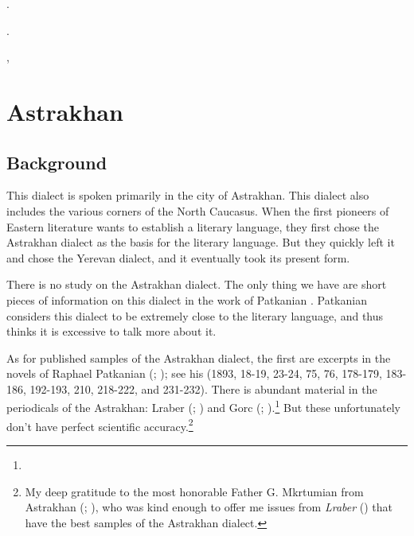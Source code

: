.

.

,







\chapter{Astrakhan}\label{chapter:Astrakhan}

\section{Background}

\begin{adjarianpage}\label{page:82}\end{adjarianpage}%

This dialect is spoken primarily in the city of Astrakhan. This dialect also includes the various corners of the North Caucasus. When the first pioneers of Eastern literature wants to establish a literary language, they first chose the Astrakhan dialect as the basis for the literary language. But they quickly left it and chose the Yerevan dialect, and it eventually took its present form. 

There is no study on the Astrakhan dialect. The only thing we have are short pieces of information on this dialect in the work of Patkanian \citep[24]{Patkanian-1869-RussianDialects}. Patkanian considers this dialect to be extremely close to the literary language, and thus thinks it is excessive to talk more about it. 

As for published samples of the Astrakhan dialect, the first are excerpts in the novels of Raphael Patkanian (; ); see his  (1893,  18-19, 23-24, 75, 76, 178-179, 183-186, 192-193, 210, 218-222, and 231-232). There is abundant material in the periodicals of the Astrakhan: Lraber (\citeauthor{LraberAstrakhan}; ) and Gorc (; ).\footnote{} But these unfortunately don't have perfect scientific accuracy.\footnote{My deep gratitude to the most honorable Father G. Mkrtumian from Astrakhan (; ), who was kind enough to offer me issues from \textit{Lraber} (\citeauthor{LraberAstrakhan}) that have the best samples of the Astrakhan dialect.}

